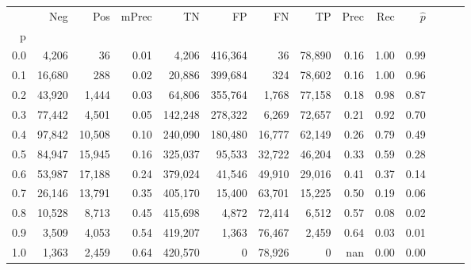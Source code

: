 \begin{tabular}{rrrrrrrrrrrrrr}
\toprule
{} &     Neg &     Pos & mPrec &       TN &       FP &      FN &      TP &  Prec &   Rec & $\hat{p}$ \\
p   &         &         &       &          &          &         &         &       &       &           \\
\midrule
0.0 &   4,206 &      36 &  0.01 &    4,206 &  416,364 &      36 &  78,890 &  0.16 &  1.00 &      0.99 \\
0.1 &  16,680 &     288 &  0.02 &   20,886 &  399,684 &     324 &  78,602 &  0.16 &  1.00 &      0.96 \\
0.2 &  43,920 &   1,444 &  0.03 &   64,806 &  355,764 &   1,768 &  77,158 &  0.18 &  0.98 &      0.87 \\
0.3 &  77,442 &   4,501 &  0.05 &  142,248 &  278,322 &   6,269 &  72,657 &  0.21 &  0.92 &      0.70 \\
0.4 &  97,842 &  10,508 &  0.10 &  240,090 &  180,480 &  16,777 &  62,149 &  0.26 &  0.79 &      0.49 \\
0.5 &  84,947 &  15,945 &  0.16 &  325,037 &   95,533 &  32,722 &  46,204 &  0.33 &  0.59 &      0.28 \\
0.6 &  53,987 &  17,188 &  0.24 &  379,024 &   41,546 &  49,910 &  29,016 &  0.41 &  0.37 &      0.14 \\
0.7 &  26,146 &  13,791 &  0.35 &  405,170 &   15,400 &  63,701 &  15,225 &  0.50 &  0.19 &      0.06 \\
0.8 &  10,528 &   8,713 &  0.45 &  415,698 &    4,872 &  72,414 &   6,512 &  0.57 &  0.08 &      0.02 \\
0.9 &   3,509 &   4,053 &  0.54 &  419,207 &    1,363 &  76,467 &   2,459 &  0.64 &  0.03 &      0.01 \\
1.0 &   1,363 &   2,459 &  0.64 &  420,570 &        0 &  78,926 &       0 &   nan &  0.00 &      0.00 \\
\bottomrule
\end{tabular}
